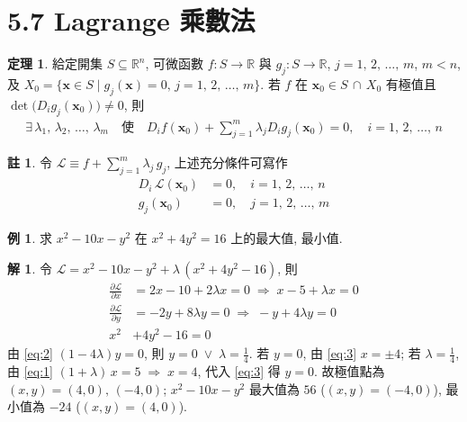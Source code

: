 \documentclass[12pt]{extarticle}
\newcommand{\ds}{\displaystyle}
\newcommand{\ie}{\;\Longrightarrow\;}
\newcommand{\orr}{\;\vee\;}
\theoremstyle{definition}
\newtheorem*{thm}{定理}
\newtheorem*{ex}{例}
\newtheorem*{sol}{解}
\newtheorem*{rmk}{註}
\newcommand{\vx}{\mathbf{x}}
\newcommand{\pdiff}[2]{\frac{\partial #1}{\partial #2}}
\begin{document}
\section*{5.7 Lagrange 乘數法}

\begin{thm}
  給定開集 $S\subseteq\mathbb{R}^n$, 可微函數 $f:S\to\mathbb{R}$ 與 $g_j:S\to\mathbb{R}$, $j=1,\,2,\,\ldots,\,m$, $m < n$, 及 $\ds X_0 = \big\{\vx\in S\;|\;g_j(\vx) = 0,\,j=1,\,2,\,\ldots,\,m\big\}$. 若 $f$ 在 $\ds\vx_0\in S\,\cap\,X_0$ 有極值且 $\det\big(D_i g_j(\vx_0)\big)\ne 0$, 則 \vspace{-2mm}
  \begin{align*}
    \exists\,\lambda_1,\,\lambda_2,\,\ldots,\,\lambda_m\quad\text{使}\quad D_i f(\vx_0) + \sum_{j = 1}^m\lambda_j D_i g_j(\vx_0) = 0,\quad\ds i = 1,\,2,\,\ldots,\,n
  \end{align*}
\end{thm}
\begin{rmk}
  令 $\ds\mathcal{L}\equiv f + \sum_{j = 1}^m \lambda_j\,g_j$, 上述充分條件可寫作
  \vspace{-2mm}
  \begin{align*}
    D_i\,\mathcal{L}(\vx_0) &= 0,\quad i = 1,\,2,\,\ldots,\,n \\
    g_j(\vx_0) &= 0,\quad j=1,\,2,\,\ldots,\,m
  \end{align*}
\end{rmk}

\begin{ex} 
  求 $\ds x^2 - 10 x - y^2$ 在 $\ds x^2 + 4 y^2 = 16$ 上的最大值, 最小值. 
\end{ex}

\begin{sol}
  令 $\ds\mathcal{L} = x^2 - 10 x - y^2 + \lambda\,(x^2 + 4 y^2 - 16)$, 則 
  \begin{align}
    \pdiff{\mathcal{L}}{x} &= 2 x - 10 + 2\lambda x = 0\ie x - 5 + \lambda x = 0 \label{eq:1}\\
    \pdiff{\mathcal{L}}{y} &= -2y + 8\lambda y = 0\ie -y + 4\lambda y = 0 \label{eq:2} \\
    x^2 &+ 4 y^2 - 16 = 0 \label{eq:3}
  \end{align}
  由 \eqref{eq:2} $(1 - 4\lambda) y = 0$, 則 $y = 0\orr\lambda = \frac{1}{4}$. 若 $y = 0$, 由 \eqref{eq:3} $x = \pm 4$; 若 $\lambda=\frac{1}{4}$, 由 \eqref{eq:1} $(1 + \lambda)\,x = 5\ie x = 4$, 代入 \eqref{eq:3} 得 $y = 0$. 故極值點為 $(x, y) = (4, 0),\,(-4, 0)$; $x^2 - 10x - y^2$ 最大值為 $56$ ($(x, y) = (-4, 0)$), 最小值為 $-24$ ($(x, y) = (4, 0)$). 
\end{sol}
\end{document}
